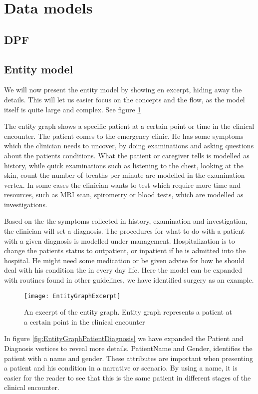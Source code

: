 \section{Data models}

\subsection{DPF}
\subsection{Entity model}

We will now present the entity model by showing en excerpt, hiding away the details. This will let us easier focus on the concepts and the flow, as the model itself is quite large and complex. See figure \ref{fig:EntityGraphExcerpt}

The entity graph shows a specific patient at a certain point or time in the clinical encounter. The patient comes to the emergency clinic. He has some symptoms which the clinician needs to uncover, by doing examinations and asking questions about the patients conditions. What the patient or caregiver tells is modelled as history, while quick examinations such as listening to the chest, looking at the skin, count the number of breaths per minute are modelled in the examination vertex. In some cases the clinician wants to test which require more time and resources, such as MRI scan, spirometry or blood tests, which are modelled as investigations.

Based on the the symptoms collected in history, examination and investigation, the clinician will set a diagnosis. The procedures for what to do with a patient with a given diagnosis is modelled under management. Hospitalization is to change the patients status to outpatient, or inpatient if he is admitted into the hospital. He might need some medication or be given advise for how he should deal with his condition the in every day life. Here the model can be expanded with routines found in other guidelines, we have identified surgery as an example. 
\begin{figure}[h!]
	\caption {An excerpt of the entity graph. Entity graph represents a patient at a certain point in the clinical encounter}
	\label{fig:EntityGraphExcerpt}
	\texttt{[image: EntityGraphExcerpt]}
\end{figure}

In figure \ref{fig:EntityGraphPatientDiagnosis} we have expanded the Patient and Diagnosis vertices to reveal more details. PatientName and Gender, identifies the patient with a name and gender. These attributes are important when presenting a patient and his condition in a narrative or scenario. By using a name, it is easier for the reader to see that this is the same patient in different stages of the clinical encounter.


